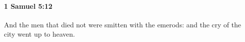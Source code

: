 
		\paragraph{1 Samuel 5:12} %
			\label{1SAMUEL-5-12}

			And the men that died not were smitten with the emerods: and the cry of the city went up to heaven.

